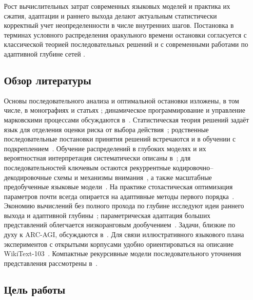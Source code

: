 Рост вычислительных затрат современных языковых моделей и практика их сжатия, адаптации и раннего
выхода делают актуальным статистически корректный учет неопределенности в числе внутренних шагов.
Постановка в терминах условного распределения оракульного времени остановки согласуется с
классической теорией последовательных решений \cite{wald1947,shiryaev2007} и с современными
работами по адаптивной глубине сетей \cite{grave2016,elbayad2020}.

\subsection{Обзор литературы}

Основы последовательного анализа и оптимальной остановки изложены, в том числе, в монографиях и
статьях \cite{wald1947,snell1952,robbins1956,shiryaev2007,peskir2006optimal}; динамическое
программирование и управление марковскими процессами обсуждаются
в~\cite{howard1960dynamic,bertsekas2005dynamic}. Статистическая теория решений задаёт язык для
отделения оценки риска от выбора действия~\cite{ferguson1967}; родственные последовательные
постановки принятия решений встречаются и в обучении с
подкреплением~\cite{sutton2018reinforcement}. Обучение распределений в глубоких моделях и их
вероятностная интерпретация систематически описаны в~\cite{goodfellow2016deep,bishop2006}; для
последовательностей ключевым остаются рекуррентные кодировочно--декодировочные схемы и механизмы
внимания~\cite{hochreiter1997long,mikolov2013efficient,bahdanau2015neural,%
sutskever2014sequence,vaswani2017attention,dosovitskiy2021image}, а также масштабные
предобученные языковые
модели~\cite{devlin2019bert,radford2019language,brown2020language}. На практике стохастическая
оптимизация параметров почти всегда опирается на адаптивные методы первого
порядка~\cite{kingma2015adam}. Экономию вычислений без полного прохода по глубине исследуют идеи
раннего выхода и адаптивной
глубины~\cite{grave2016,elbayad2020,teerapittayanon2016branchynet,xin2020deebert}; параметрическая
адаптация больших представлений облегчается низкоранговым дообучением~\cite{hu2021}. Задачи,
близкие по духу к ARC-AGI, обсуждаются в~\cite{chollet2019,arcagi}. Для связи иллюстративного
языкового плана экспериментов с открытыми корпусами удобно ориентироваться на описание
WikiText-103~\cite{merity2016}. Компактные рекурсивные модели последовательного уточнения
представления рассмотрены в~\cite{trm}.

\subsection{Цель работы}

